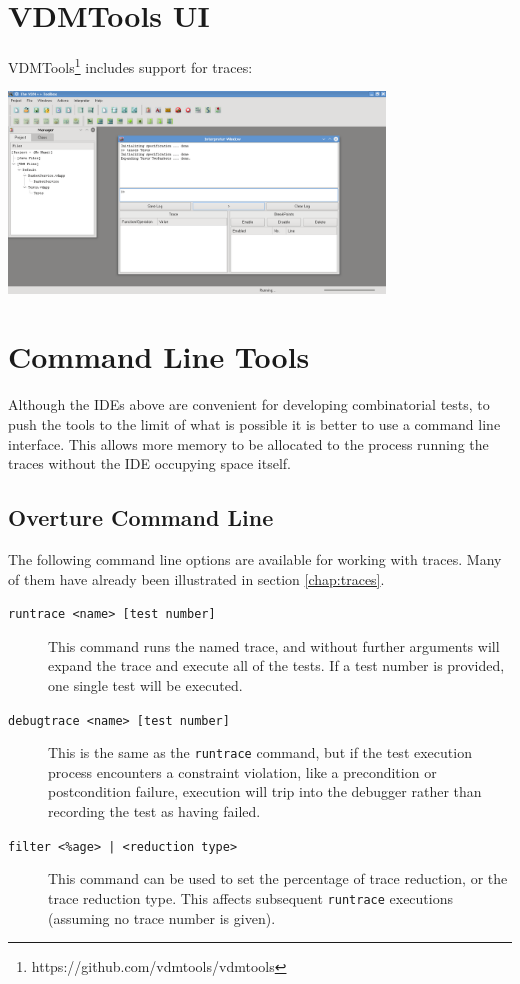 \documentclass{overturerepchap}
\begin{document}
\section{VDMTools UI}

VDMTools\footnote{https://github.com/vdmtools/vdmtools} includes support for
traces:

\begin{center}
\includegraphics[width=10cm]{vdmtools}
\end{center}


\section{Command Line Tools}

Although the IDEs above are convenient for developing combinatorial tests, to
push the tools to the limit of what is possible it is better to use a command
line interface. This allows more memory to be allocated to the process running
the traces without the IDE occupying space itself.

\subsection{Overture Command Line}

The following command line options are available for working with traces. Many
of them have already been illustrated in section \ref{chap:traces}.

\begin{description}
\item[\texttt{runtrace <name> [test number]}] This command runs the named trace,
and without further arguments will expand the trace and execute all of the
tests. If a test number is provided, one single test will be executed.
\item[\texttt{debugtrace <name> [test number]}] This is the same as the
\texttt{runtrace} command, but if the test execution process encounters a
constraint violation, like a precondition or postcondition failure, execution
will trip into the debugger rather than recording the test as having failed.
\item[\texttt{filter <\%age> | <reduction type>}] This command can be used to
set the percentage of trace reduction, or the trace reduction type. This affects
subsequent \texttt{runtrace} executions (assuming no trace number is given).
\end{description}
\end{document}
